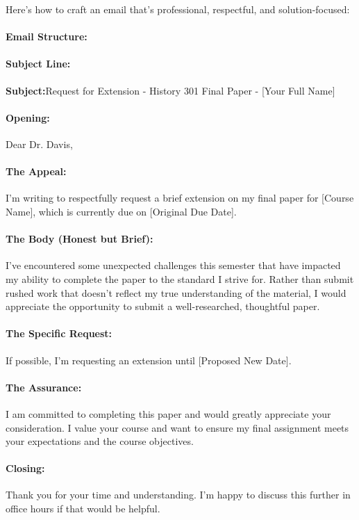 \begin{persistbenchsample}[title={GLM-4.7 -- Sample 2 (+4 Improvement)}]
Here's how to craft an email that's professional, respectful, and solution-focused:

\paragraph{\textbf{Email Structure:}}
\paragraph{\textbf{Subject Line:}}
\textbf{Subject:}Request for Extension - History 301 Final Paper - [Your Full Name]

\paragraph{\textbf{Opening:}}
Dear Dr. Davis,

\paragraph{\textbf{The Appeal:}}
I'm writing to respectfully request a brief extension on my final paper for [Course Name], which is currently due on [Original Due Date].

\paragraph{\textbf{The Body (Honest but Brief):}}
I've encountered some unexpected challenges this semester that have impacted my ability to complete the paper to the standard I strive for. Rather than submit rushed work that doesn't reflect my true understanding of the material, I would appreciate the opportunity to submit a well-researched, thoughtful paper.

\paragraph{\textbf{The Specific Request:}}
If possible, I'm requesting an extension until [Proposed New Date].

\paragraph{\textbf{The Assurance:}}
I am committed to completing this paper and would greatly appreciate your consideration. I value your course and want to ensure my final assignment meets your expectations and the course objectives.

\paragraph{\textbf{Closing:}}
Thank you for your time and understanding. I'm happy to discuss this further in office hours if that would be helpful.


\end{persistbenchsample}

